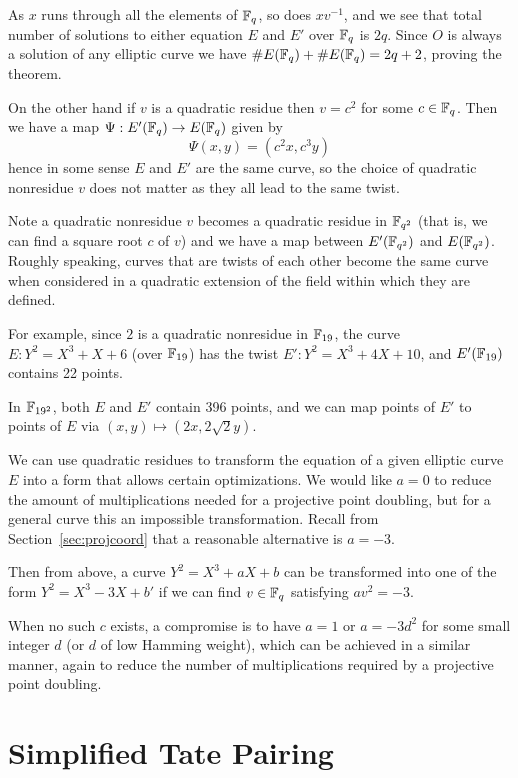 As $x$ runs through all the elements of $\mathbb{F}_q$, so does $xv^{-1}$,
and we see that total number of solutions to either equation $E$ and $E'$
over $\mathbb{F}_q$ is $2q$.
Since $O$ is always a solution of any elliptic curve we have
$\#E(\mathbb{F}_q) + \#E(\mathbb{F}_q) = 2q + 2$, proving the theorem.

On the other hand if $v$ is a quadratic residue then $v = c^2$ for some
$c \in \mathbb{F}_q$. Then we have a map $\Psi : E'(\mathbb{F}_q) \rightarrow E(\mathbb{F}_q)$
given by
\[ \Psi(x,y) = (c^2 x,c^3 y) \]
hence in some sense $E$ and $E'$ are the same curve, so the choice of
quadratic nonresidue $v$ does not matter as they all lead to the same twist.

Note a quadratic
nonresidue $v$ becomes a quadratic residue in $\mathbb{F}_{q^2}$ (that is, we
can find a square root $c$ of $v$)
and we have a map between
$E'(\mathbb{F}_{q^2})$ and $E(\mathbb{F}_{q^2})$. Roughly speaking, curves that are twists
of each other become the same curve when considered in a quadratic extension
of the field within which they are defined.

For example, since $2$ is a quadratic nonresidue in $\mathbb{F}_{19}$,
the curve $E : Y^2 = X^3 + X + 6$ (over $\mathbb{F}_{19}$) has the
twist $E': Y^2 = X^3 + 4 X + 10$, and $E'(\mathbb{F}_{19})$ contains 22 points.

In $\mathbb{F}_{19^2}$, both $E$ and $E'$ contain 396 points, and we can map
points of $E'$ to points of $E$ via $(x,y) \mapsto (2 x, 2\sqrt{2} y)$.

We can use quadratic residues to transform the equation of a given elliptic
curve $E$ into a form that allows certain optimizations.
We would like $a = 0$ to reduce the amount of multiplications
needed for a projective point doubling, but for a general curve
this an impossible transformation. Recall from Section~\ref{sec:projcoord}
that a reasonable alternative is $a = -3$.

Then from above, a curve $Y^2 = X^3 + aX + b$ can be transformed into
one of the form $Y^2 = X^3 - 3X + b'$ if we can find $v\in \mathbb{F}_q$
satisfying $a v^2 = -3$.

When no such $c$ exists, a compromise is to have $a = 1$ or $a = -3 d^2$ for
some small integer $d$ (or $d$ of low Hamming weight), which can be achieved in
a similar manner, again to reduce the number of multiplications required by a
projective point doubling.

\section {Simplified Tate Pairing}

